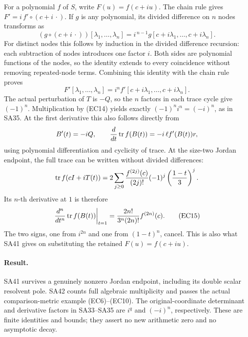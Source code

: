 For a polynomial \(f\) of \(S\), write \(F(u)=f(c+iu)\).
The chain rule gives \(F'=i\,f'\circ(c+i\,\cdot)\).
If \(g\) is any polynomial, its divided difference on \(n\)
nodes transforms as
\[
 (g\circ(c+i\,\cdot))[\lambda_1,\ldots,\lambda_n]
   =i^{\,n-1}g[c+i\lambda_1,\ldots,c+i\lambda_n].
\]
For distinct nodes this follows by induction in the divided
difference recursion: each subtraction of nodes introduces
one factor \(i\). Both sides are polynomial functions of
the nodes, so the identity extends to every coincidence
without removing repeated-node terms.
Combining this identity with the chain rule proves
\begin{equation}
 F'[\lambda_1,\ldots,\lambda_n]
   =i^n f'[c+i\lambda_1,\ldots,c+i\lambda_n].
 \tag{EC14}
\end{equation}
The actual perturbation of \(T\) is \(-Q\), so the
\(n\) factors in each trace cycle give \((-1)^n\).
Multiplication by (EC14) yields exactly
\((-1)^ni^n=(-i)^n\), as in SA35.
At the first derivative this also follows directly from
\[
 B'(t)=-iQ,\qquad
 \frac{d}{dt}\operatorname{tr} f(B(t))=-i\,\ell f'(B(t))r,
\]
using polynomial differentiation and cyclicity of trace.
At the size-two Jordan endpoint, the full trace can be
written without divided differences:
\[
 \operatorname{tr} f(cI+iT(t))
   =2\sum_{j\ge0}\frac{f^{(2j)}(c)}{(2j)!}
       (-1)^j\left(\frac{1-t}{3}\right)^j .
\]
Its \(n\)-th derivative at \(1\) is therefore
\begin{equation}
 \left.\frac{d^n}{dt^n}\operatorname{tr} f(B(t))\right|_{t=1}
   =\frac{2n!}{3^n(2n)!}f^{(2n)}(c).
 \tag{EC15}
\end{equation}
The two signs, one from \(i^{2n}\) and one from
\((1-t)^n\), cancel. This is also what SA41 gives on
substituting the retained \(F(u)=f(c+iu)\).

\paragraph{Result.}
SA41 survives a genuinely nonzero Jordan endpoint, including its
double scalar resolvent pole. SA42 counts full algebraic multiplicity
and passes the actual comparison-metric example (EC6)--(EC10).
The original-coordinate determinant and derivative factors in
SA33--SA35 are \(i^q\) and \((-i)^n\), respectively.
These are finite identities and bounds; they assert no new arithmetic
zero and no asymptotic decay.

\endgroup

\clearpage\begingroup
